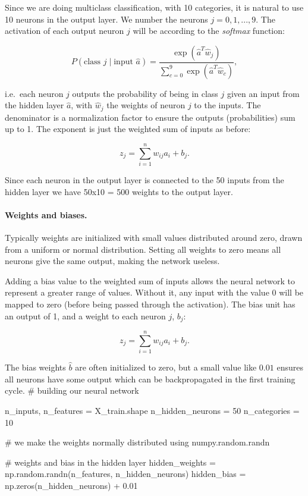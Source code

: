 \documentclass[%
oneside,                 %
final,                   %
10pt]{article}
\begin{document}
Since we are doing multiclass classification, with 10 categories, it is natural to use 10 neurons in the output layer. We number the neurons $j = 0,1,...,9$. The activation of each output neuron $j$ will be according to the \emph{softmax} function:  

$$ P(\text{class $j$} \mid \text{input $\hat{a}$}) = \frac{\exp{(\hat{a}^T \hat{w}_j)}}
{\sum_{c=0}^{9} \exp{(\hat{a}^T \hat{w}_c)}} ,$$  

i.e.~each neuron $j$ outputs the probability of being in class $j$ given an input from the hidden layer $\hat{a}$, with $\hat{w}_j$ the weights of neuron $j$ to the inputs.  
The denominator is a normalization factor to ensure the outputs (probabilities) sum up to 1.  
The exponent is just the weighted sum of inputs as before:  

$$ z_j = \sum_{i=1}^n w_ {ij} a_i+b_j.$$  

Since each neuron in the output layer is connected to the 50 inputs from the hidden layer we have 50x10 = 500
weights to the output layer.

\paragraph{Weights and biases.}
Typically weights are initialized with small values distributed around zero, drawn from a uniform
or normal distribution. Setting all weights to zero means all neurons give the same output, making the network useless.  

Adding a bias value to the weighted sum of inputs allows the neural network to represent a greater range
of values. Without it, any input with the value 0 will be mapped to zero (before being passed through the activation). The bias unit has an output of 1, and a weight to each neuron $j$, $b_j$:  

$$ z_j = \sum_{i=1}^n w_ {ij} a_i + b_j.$$  

The bias weights $\hat{b}$ are often initialized to zero, but a small value like $0.01$ ensures all neurons have some output which can be backpropagated in the first training cycle.
\bpycod
# building our neural network

n_inputs, n_features = X_train.shape
n_hidden_neurons = 50
n_categories = 10

# we make the weights normally distributed using numpy.random.randn

# weights and bias in the hidden layer
hidden_weights = np.random.randn(n_features, n_hidden_neurons)
hidden_bias = np.zeros(n_hidden_neurons) + 0.01
\end{document}
